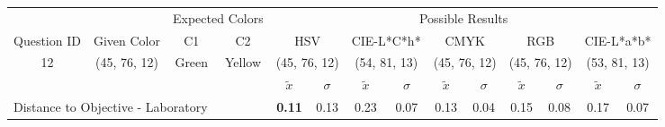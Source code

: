 %
\begin{table}[H]
  \resizebox{\textwidth}{!} {
  \begin{tabular}{lccccccccccccc}
    \hline
    \multicolumn{1}{c}{}                              &                                      & \multicolumn{2}{c}{Expected Colors}                   & \multicolumn{10}{c}{Possible Results}                                                                                                                                                                                                                                                                                        \\ \cline{3-14}
    \multicolumn{1}{c}{\multirow{-2}{*}{Question ID}} & \multirow{-2}{*}{Given Color}        & C1                       & C2                         & \multicolumn{2}{c}{HSV}                                        & \multicolumn{2}{c}{CIE-L*C*h*}                                 & \multicolumn{2}{c}{CMYK}                                       & \multicolumn{2}{c}{RGB}                                        & \multicolumn{2}{c}{CIE-L*a*b*}                                 \\ \hline
    \multicolumn{1}{c}{12}                             & \cellcolor[HTML]{80FF00}(45, 76, 12) & \multicolumn{1}{c|}{Green} & \multicolumn{1}{c|}{Yellow}  & \multicolumn{2}{c|}{\cellcolor[HTML]{80FF00}(45, 76, 12)}      & \multicolumn{2}{c|}{\cellcolor[HTML]{B1FF00}(54, 81, 13)}       & \multicolumn{2}{c|}{\cellcolor[HTML]{80FF00}(45, 76, 12)}       & \multicolumn{2}{c|}{\cellcolor[HTML]{80FF00}(45, 76, 12)}       & \multicolumn{2}{c|}{\cellcolor[HTML]{AEFF00}(53, 81, 13)}       \\ \hline
                                                      & \multicolumn{1}{l}{}                 & \multicolumn{1}{l}{}     & \multicolumn{1}{l}{}       & \multicolumn{1}{c}{$\tilde{x}$} & \multicolumn{1}{c}{$\sigma$} & \multicolumn{1}{c}{$\tilde{x}$} & \multicolumn{1}{c}{$\sigma$} & \multicolumn{1}{c}{$\tilde{x}$} & \multicolumn{1}{c}{$\sigma$} & \multicolumn{1}{c}{$\tilde{x}$} & \multicolumn{1}{c}{$\sigma$} & \multicolumn{1}{c}{$\tilde{x}$} & \multicolumn{1}{c}{$\sigma$} \\ \hline
    \multicolumn{4}{l}{Distance to Objective - Laboratory}                                                                                           & \multicolumn{1}{|c}{\textbf{0.11}}       & \multicolumn{1}{c|}{0.13}    & \multicolumn{1}{|c}{0.23}       & \multicolumn{1}{c|}{0.07}    & \multicolumn{1}{|c}{0.13}       & \multicolumn{1}{c|}{0.04}    & \multicolumn{1}{|c}{0.15}       & \multicolumn{1}{c|}{0.08}    & \multicolumn{1}{|c}{0.17}       & \multicolumn{1}{c|}{0.07}    \\

\end{tabular}}
\end{table}

